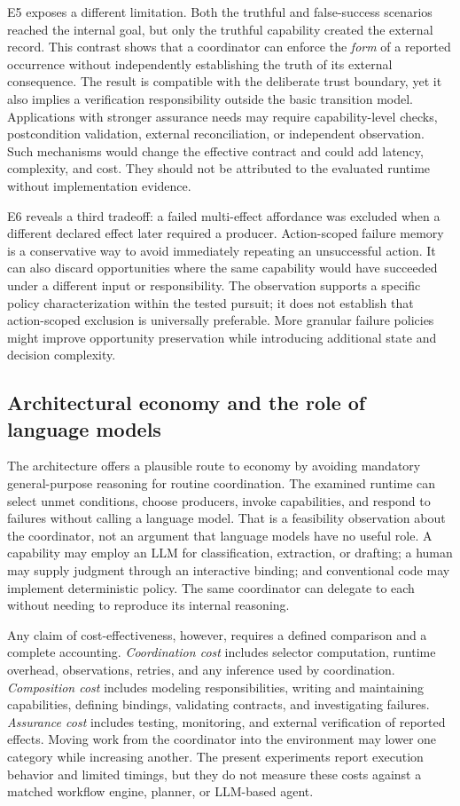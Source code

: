 \documentclass[11pt]{article}
\begin{document}
E5 exposes a different limitation. Both the truthful and false-success scenarios reached the internal goal, but only the truthful capability created the external record. This contrast shows that a coordinator can enforce the \emph{form} of a reported occurrence without independently establishing the truth of its external consequence. The result is compatible with the deliberate trust boundary, yet it also implies a verification responsibility outside the basic transition model. Applications with stronger assurance needs may require capability-level checks, postcondition validation, external reconciliation, or independent observation. Such mechanisms would change the effective contract and could add latency, complexity, and cost. They should not be attributed to the evaluated runtime without implementation evidence.

E6 reveals a third tradeoff: a failed multi-effect affordance was excluded when a different declared effect later required a producer. Action-scoped failure memory is a conservative way to avoid immediately repeating an unsuccessful action. It can also discard opportunities where the same capability would have succeeded under a different input or responsibility. The observation supports a specific policy characterization within the tested pursuit; it does not establish that action-scoped exclusion is universally preferable. More granular failure policies might improve opportunity preservation while introducing additional state and decision complexity.



\subsection{Architectural economy and the role of language models}
The architecture offers a plausible route to economy by avoiding mandatory general-purpose reasoning for routine coordination. The examined runtime can select unmet conditions, choose producers, invoke capabilities, and respond to failures without calling a language model. That is a feasibility observation about the coordinator, not an argument that language models have no useful role. A capability may employ an LLM for classification, extraction, or drafting; a human may supply judgment through an interactive binding; and conventional code may implement deterministic policy. The same coordinator can delegate to each without needing to reproduce its internal reasoning.

Any claim of cost-effectiveness, however, requires a defined comparison and a complete accounting. \emph{Coordination cost} includes selector computation, runtime overhead, observations, retries, and any inference used by coordination. \emph{Composition cost} includes modeling responsibilities, writing and maintaining capabilities, defining bindings, validating contracts, and investigating failures. \emph{Assurance cost} includes testing, monitoring, and external verification of reported effects. Moving work from the coordinator into the environment may lower one category while increasing another. The present experiments report execution behavior and limited timings, but they do not measure these costs against a matched workflow engine, planner, or LLM-based agent.
\end{document}
